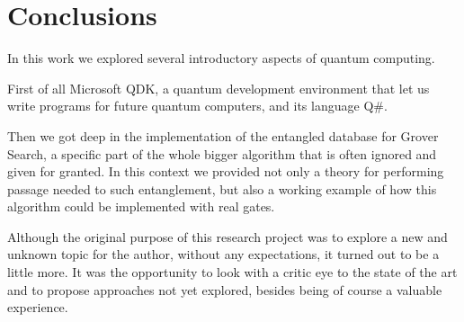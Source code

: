 
\chapter{Conclusions}
\label{chp:conclusions}

In this work we explored several introductory aspects of quantum computing.

First of all Microsoft QDK, a quantum development environment that let us write programs for future quantum computers, and its language Q\#.

Then we got deep in the implementation of the entangled database for Grover Search, a specific part of the whole bigger algorithm that is often ignored and given for granted. In this context we provided not only a theory for performing passage needed to such entanglement, but also a working example of how this algorithm could be implemented with real gates.

Although the original purpose of this research project was to explore a new and unknown topic for the author, without any expectations, it turned out to be a little more. It was the opportunity to look with a critic eye to the state of the art and to propose approaches not yet explored, besides being of course a valuable experience.